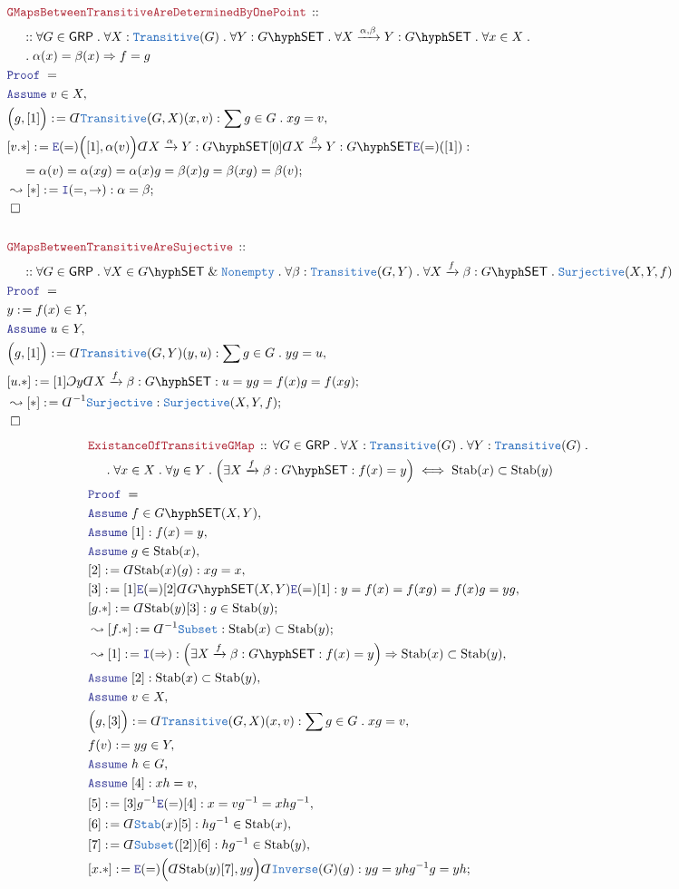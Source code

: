 \documentclass[12pt]{scrartcl}
\newcommand{\TYPE}[1]{\textcolor{NavyBlue}{\mathtt{#1}}}
\newcommand{\LOGIC}[1]{\textcolor{Blue}{\mathtt{#1}}}
\newcommand{\THM}[1]{\textcolor{Maroon}{\mathtt{#1}}}
\renewcommand{\.}{\; . \;}
\newcommand{\de}{: \kern 0.1pc =}
\newcommand{\Theorem}[2]{& \THM{#1} \, :: \, #2 \\ & \Proof = \\ }
\newcommand{\NewLine}{\\ & \kern 1pc}
\newcommand{\Page}[1]{ \begin{align*} #1 \end{align*}   }
\newcommand{ \bd }{ \ByDef }
\renewcommand{\And}{\; \& \;}
\newcommand{\Imply}{\Rightarrow}
\newcommand{\Intro}{\LOGIC{I}}
\newcommand{\Elim}{\LOGIC{E}}
\newcommand{\Arrow}{\xrightarrow}
\newcommand{\Say}[3]{& #1 \de #2 : #3, \\}
\newcommand{\SayIn}[3]{& #1 \de #2 \in #3, \\}
\newcommand{\Conclude}[3]{& #1 \de #2 : #3; \\}
\newcommand{\Derive}[3]{& \leadsto #1 \de #2 : #3, \\}
\newcommand{\DeriveConclude}[3]{& \leadsto #1 \de #2 : #3 ; \\}
\newcommand{\Assume}[2]{& \LOGIC{Assume} \; #1 : #2, \\}
\newcommand{\AssumeIn}[2]{& \LOGIC{Assume} \; #1 \in #2, \\}
\newcommand{\QED}{\; \square}
\newcommand{\EndProof}{& \QED \\}
\newcommand{\ByDef}{\rotatebox[origin=c]{-180}{$D$}}%
\newcommand{\ByConstr}{\rotatebox[origin=c]{-180}{$C$}}%
\newcommand{\Proof}{\LOGIC{Proof} \; }
\newcommand{\SET}{\mathsf{SET}}
\newcommand{\Stab}{\mathrm{Stab}}
\newcommand{\GRP}{\mathsf{GRP}}
\begin{document}
\Page{
	\Theorem{GMapsBetweenTransitiveAreDeterminedByOnePoint}
	{
		\NewLine ::
		\forall G \in \GRP \.
		\forall X : \TYPE{Transitive}(G) \.
		\forall Y : G\hyph\SET \.
		\forall X \Arrow{\alpha,\beta} Y : G\hyph\SET \.
		\forall x \in X \. 
		\NewLine \. 
		\alpha(x) = \beta(x) \Imply f = g 
	}
	\AssumeIn{v}{X}
	\Say{\Big(g,[1] \Big)}{\bd \TYPE{Transitive}(G,X)(x,v)}
	{
		\sum g \in G \. xg=v
	}
	\Conclude{[v.*]}{
		\Elim(=)\Big([1],\alpha(v)\Big) 
		\bd X \Arrow{\alpha} Y : G\hyph\SET
		[0]
		\bd X \Arrow{\beta} Y : G\hyph\SET
		\Elim(=)([1])
	}
	{
		\NewLine = 
		\alpha(v) =
		\alpha(xg) =
		\alpha(x)g = 
		\beta(x)g =
		\beta(xg) =
		\beta(v)
	}	
	\DeriveConclude{[*]}{\Intro(=,\to)}{\alpha = \beta}
	\EndProof
	\\
	\Theorem{GMapsBetweenTransitiveAreSujective}
	{
		\NewLine ::
		\forall G \in \GRP \.
		\forall X \in G\hyph\SET \And \TYPE{Nonempty} \.
		\forall \beta : \TYPE{Transitive}(G,Y) \.
		\forall X \Arrow{f} \beta : G\hyph\SET \.
		\TYPE{Surjective}(X,Y,f)
	}
	\SayIn{y}{f(x)}{Y}
	\AssumeIn{u}{Y}
	\Say{\Big(g,[1] \Big)}{\bd \TYPE{Transitive}(G,Y)(y,u)}
	{
		\sum g \in G \. yg=u
	}
	\Conclude{[u.*]}{[1]\ByConstr y \bd X \Arrow{f} \beta : G\hyph\SET }
	{
		u = yg = f(x)g = f(xg)
	}
	\DeriveConclude{[*]}{\bd^{-1} \TYPE{Surjective}}
	{
		\TYPE{Surjective}(X,Y,f)
	}
	\EndProof
}\Page{
	\Theorem{ExistanceOfTransitiveGMap}
	{
		\forall G \in \GRP \.
		\forall X : \TYPE{Transitive}(G) \.
		\forall Y : \TYPE{Transitive}(G) \.
		\NewLine \.
		\forall x \in X \.
		\forall y \in Y \.
		\Big( \exists X  \Arrow{f} \beta : G\hyph\SET : f(x) = y \Big) 
		\iff
		\Stab(x) \subset \Stab(y)
	}
	\AssumeIn{f}{G\hyph \SET (X,Y)}
	\Assume{[1]}{f(x) = y}
	\AssumeIn{g}{\Stab(x)}
	\Say{[2]}{\bd \Stab(x)(g)}{xg = x}
	\Say{[3]}{[1]\Elim(=)[2] \bd G\hyph \SET (X,Y)\Elim(=)[1]}
	{
		y = 
		f(x) = 
		f(xg) = 
		f(x)g =
		yg
	}
	\Conclude{[g.*]}{\bd \Stab(y) [3]}{g \in \Stab(y)}
	\DeriveConclude{[f.*]}{\bd^{-1} \TYPE{Subset}}
	{
		\Stab(x) \subset \Stab(y)
	}
	\Derive{[1]}{\Intro(\Imply)}
	{
		\Big( \exists X  \Arrow{f} \beta : G\hyph\SET : f(x) = y \Big) 
		\Imply
		\Stab(x) \subset \Stab(y)
	}
	\Assume{[2]}{\Stab(x) \subset \Stab(y)}
	\AssumeIn{v}{X}
	\Say{\Big(g,[3] \Big)}{\bd \TYPE{Transitive}(G,X)(x,v)}
	{
		\sum g \in G \. xg= v
	}	
	\SayIn{f(v)}{yg}{Y}
	\AssumeIn{h}{G}
	\Assume{[4]}{xh = v}
	\Say{[5]}
	{
		[3]g^{-1} \Elim(=)[4]	
	}
	{ 
		x = vg^{-1} = xhg^{-1}
	}
	\Say{[6]}
	{
		\bd \TYPE{Stab}(x)[5]
	}
	{
		hg^{-1} \in \Stab(x)
	}
	\Say{[7]}{ \bd \TYPE{Subset}([2])[6] }{hg^{-1} \in \Stab(y)}
	\Conclude{[x.*]}{ \Elim(=)\Big( \bd \Stab(y)[7],yg \Big) \bd \TYPE{Inverse}(G)(g) }{ yg =yhg^{-1}g = yh  }
}
\end{document}
